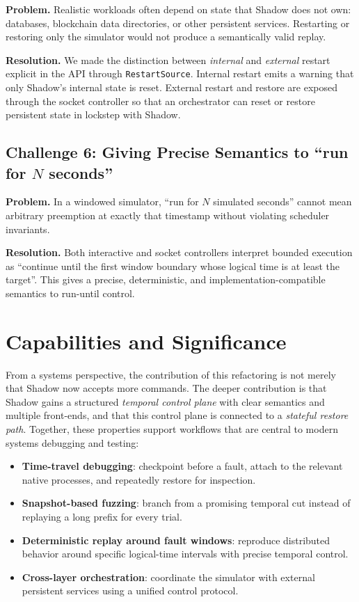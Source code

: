 \documentclass[11pt,a4paper]{article}
\begin{document}
\textbf{Problem.}
Realistic workloads often depend on state that Shadow does not own: databases,
blockchain data directories, or other persistent services. Restarting or
restoring only the simulator would not produce a semantically valid replay.

\textbf{Resolution.}
We made the distinction between \emph{internal} and \emph{external} restart
explicit in the API through \texttt{RestartSource}. Internal restart emits a
warning that only Shadow's internal state is reset. External restart and
restore are exposed through the socket controller so that an orchestrator can
reset or restore persistent state in lockstep with Shadow.

\subsection{Challenge 6: Giving Precise Semantics to ``run for \(N\) seconds''}

\textbf{Problem.}
In a windowed simulator, ``run for \(N\) simulated seconds'' cannot mean
arbitrary preemption at exactly that timestamp without violating scheduler
invariants.

\textbf{Resolution.}
Both interactive and socket controllers interpret bounded execution as
``continue until the first window boundary whose logical time is at least the
target''. This gives a precise, deterministic, and implementation-compatible
semantics to run-until control.

\section{Capabilities and Significance}

From a systems perspective, the contribution of this refactoring is not merely
that Shadow now accepts more commands. The deeper contribution is that Shadow
gains a structured \emph{temporal control plane} with clear semantics and
multiple front-ends, and that this control plane is connected to a
\emph{stateful restore path}. Together, these properties support workflows
that are central to modern systems debugging and testing:

\begin{itemize}[leftmargin=1.7em]
  \item \textbf{Time-travel debugging}: checkpoint before a fault, attach to
  the relevant native processes, and repeatedly restore for inspection.
  \item \textbf{Snapshot-based fuzzing}: branch from a promising temporal cut
  instead of replaying a long prefix for every trial.
  \item \textbf{Deterministic replay around fault windows}: reproduce
  distributed behavior around specific logical-time intervals with precise
  temporal control.
  \item \textbf{Cross-layer orchestration}: coordinate the simulator with
  external persistent services using a unified control protocol.
\end{itemize}
\end{document}
